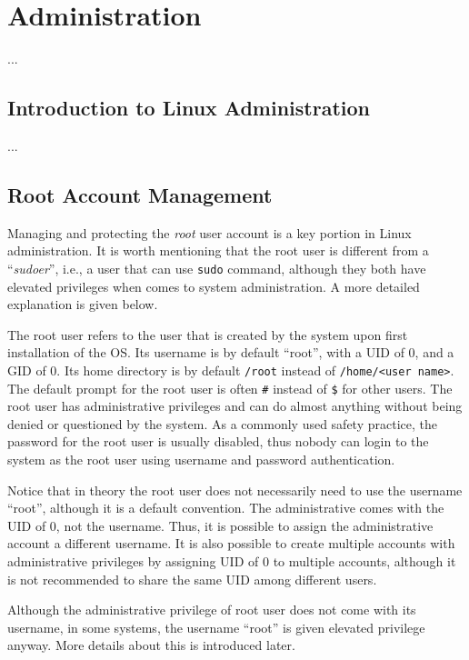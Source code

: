 \chapter{Administration}
...

\section{Introduction to Linux Administration}
...


\section{Root Account Management}

Managing and protecting the \textit{root} user account is a key portion in Linux administration. It is worth mentioning that the root user is different from a ``\textit{sudoer}'', i.e., a user that can use \verb|sudo| command, although they both have elevated privileges when comes to system administration. A more detailed explanation is given below.

The root user refers to the user that is created by the system upon first installation of the OS. Its username is by default ``root'', with a UID of 0, and a GID of 0. Its home directory is by default \verb|/root| instead of \verb|/home/<user name>|. The default prompt for the root user is often \verb|#| instead of \verb|$| for other users. The root user has administrative privileges and can do almost anything without being denied or questioned by the system. As a commonly used safety practice, the password for the root user is usually disabled, thus nobody can login to the system as the root user using username and password authentication.

Notice that in theory the root user does not necessarily need to use the username ``root'', although it is a default convention. The administrative  comes with the UID of 0, not the username. Thus, it is possible to assign the administrative account a different username. It is also possible to create multiple accounts with administrative privileges by assigning UID of 0 to multiple accounts, although it is not recommended to share the same UID among different users.

Although the administrative privilege of root user does not come with its username, in some systems, the username ``root'' is given elevated privilege anyway. More details about this is introduced later.


